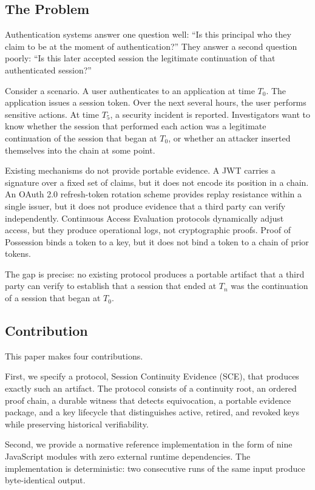 \documentclass[11pt,a4paper]{article}
\begin{document}
\subsection{The Problem}

Authentication systems answer one question well: ``Is this principal who they claim to be at the moment of authentication?'' They answer a second question poorly: ``Is this later accepted session the legitimate continuation of that authenticated session?''

Consider a scenario. A user authenticates to an application at time $T_0$. The application issues a session token. Over the next several hours, the user performs sensitive actions. At time $T_5$, a security incident is reported. Investigators want to know whether the session that performed each action was a legitimate continuation of the session that began at $T_0$, or whether an attacker inserted themselves into the chain at some point.

Existing mechanisms do not provide portable evidence. A JWT carries a signature over a fixed set of claims, but it does not encode its position in a chain. An OAuth 2.0 refresh-token rotation scheme provides replay resistance within a single issuer, but it does not produce evidence that a third party can verify independently. Continuous Access Evaluation protocols dynamically adjust access, but they produce operational logs, not cryptographic proofs. Proof of Possession binds a token to a key, but it does not bind a token to a chain of prior tokens.

The gap is precise: no existing protocol produces a portable artifact that a third party can verify to establish that a session that ended at $T_n$ was the continuation of a session that began at $T_0$.

\subsection{Contribution}

This paper makes four contributions.

First, we specify a protocol, Session Continuity Evidence (SCE), that produces exactly such an artifact. The protocol consists of a continuity root, an ordered proof chain, a durable witness that detects equivocation, a portable evidence package, and a key lifecycle that distinguishes active, retired, and revoked keys while preserving historical verifiability.

Second, we provide a normative reference implementation in the form of nine JavaScript modules with zero external runtime dependencies. The implementation is deterministic: two consecutive runs of the same input produce byte-identical output.
\end{document}
